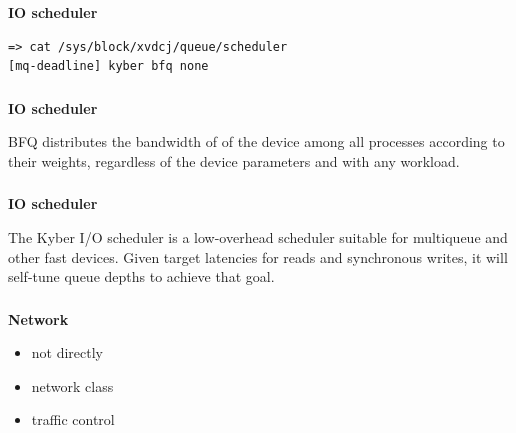 \documentclass[usenames,dvipsnames, 18pt, compress, aspectratio=169]{beamer}
\begin{document}
\begin{frame}[fragile]{}
    \frametitle{}
    \begin{center}
        \textbf{IO scheduler}

        \begin{flushleft}
		\begin{verbatim}
=> cat /sys/block/xvdcj/queue/scheduler
[mq-deadline] kyber bfq none
        \end{verbatim}
        \end{flushleft}

    \end{center}
\end{frame}

\begin{frame}[fragile]{}
    \frametitle{}
    \begin{center}
        \textbf{IO scheduler}

        \begin{flushleft}
BFQ distributes the bandwidth of of the device among all processes according to
their weights, regardless of the device parameters and with any workload.
        \end{flushleft}

    \end{center}
\end{frame}

\begin{frame}[fragile]{}
    \frametitle{}
    \begin{center}
        \textbf{IO scheduler}

        \begin{flushleft}
The Kyber I/O scheduler is a low-overhead scheduler suitable for multiqueue and
other fast devices. Given target latencies for reads and synchronous writes, it
will self-tune queue depths to achieve that goal.
        \end{flushleft}

    \end{center}
\end{frame}

\begin{frame}[fragile]{}
    \frametitle{}
    \begin{center}
        \textbf{Network}

        \begin{itemize}[]
			\item not directly
            \item network class
            \item traffic control
        \end{itemize}

    \end{center}
\end{frame}
\end{document}
